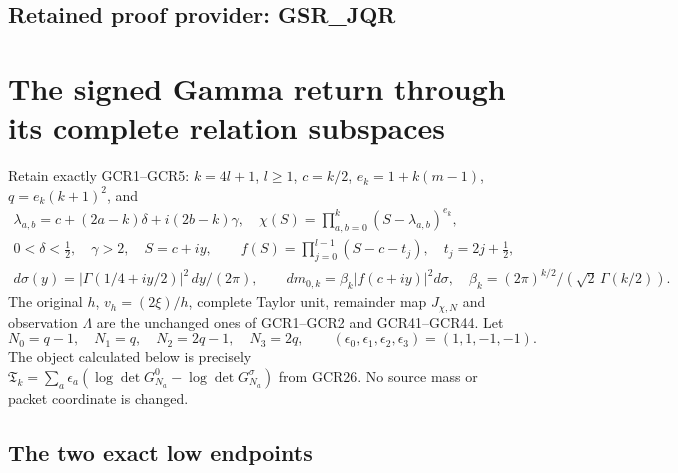 \documentclass[11pt,a4paper]{article}
\begin{document}

\clearpage
\subsection*{Retained proof provider: GSR\_JQR}

\section{The signed Gamma return through its complete relation subspaces}
\label{sec:gsr-signed-gamma}

Retain exactly GCR1--GCR5: $k=4l+1$, $l\geq1$,
$c=k/2$, $e_k=1+k(m-1)$, $q=e_k(k+1)^2$, and
\[
\begin{gathered}
 \lambda_{a,b}=c+(2a-k)\delta+i(2b-k)\gamma,\quad
 \chi(S)=\prod_{a,b=0}^k(S-\lambda_{a,b})^{e_k},\\
 0<\delta<\tfrac12,\quad\gamma>2,\quad S=c+iy,\qquad
 f(S)=\prod_{j=0}^{l-1}(S-c-t_j),\quad t_j=2j+\tfrac12,\\
 d\sigma(y)=|\Gamma(1/4+iy/2)|^2\,dy/(2\pi),\qquad
 dm_{0,k}=\beta_k|f(c+iy)|^2d\sigma,\quad
 \beta_k=(2\pi)^{k/2}/(\sqrt2\,\Gamma(k/2)).
\end{gathered}\tag{GSR1}
\]
The original $h$, $v_h=(2\xi)/h$, complete Taylor unit,
remainder map $J_{\chi,N}$ and observation $\Lambda$ are the
unchanged ones of GCR1--GCR2 and GCR41--GCR44.
Let
\[
 N_0=q-1,\quad N_1=q,\quad N_2=2q-1,\quad N_3=2q,
 \qquad(\epsilon_0,\epsilon_1,\epsilon_2,\epsilon_3)=(1,1,-1,-1).
\]
The object calculated below is precisely
$\mathfrak T_k=\sum_a\epsilon_a
(\log\det G_{N_a}^0-\log\det G_{N_a}^\sigma)$
from GCR26. No source mass or packet coordinate is changed.

\subsection{The two exact low endpoints}
\end{document}
